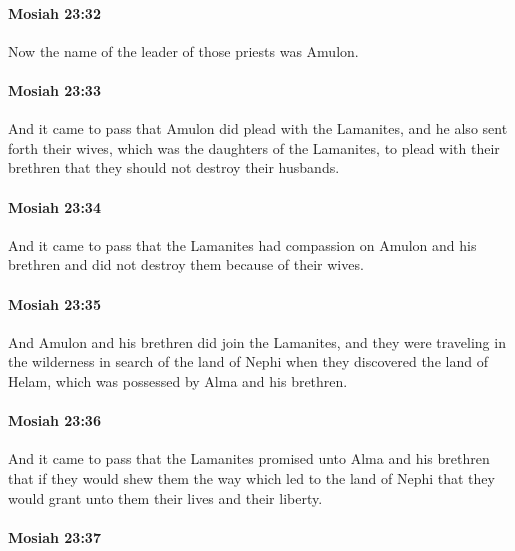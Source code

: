		\paragraph{Mosiah 23:32} %
			\label{MOSIAH-23-32}

			Now the name of the leader of those priests was Amulon.

		\paragraph{Mosiah 23:33} %
			\label{MOSIAH-23-33}

			And it came to pass that Amulon did plead with the Lamanites,
			and he also sent forth their wives,
			which was the daughters of the Lamanites,
			to plead with their brethren
			that they should not destroy their husbands.

		\paragraph{Mosiah 23:34} %
			\label{MOSIAH-23-34}

			And it came to pass that
			the Lamanites had compassion on Amulon and his brethren
			and did not destroy them because of their wives.

		\paragraph{Mosiah 23:35} %
			\label{MOSIAH-23-35}

			And Amulon and his brethren did join the Lamanites,
			and they were traveling in the wilderness in search of the land of Nephi
			when they discovered the land of Helam,
			which was possessed by Alma and his brethren.

		\paragraph{Mosiah 23:36} %
			\label{MOSIAH-23-36}

			And it came to pass that the Lamanites promised unto Alma and his brethren
			that if they would shew them the way which led to the land of Nephi
			that they would grant unto them their lives and their liberty.

		\paragraph{Mosiah 23:37} %
			\label{MOSIAH-23-37}

